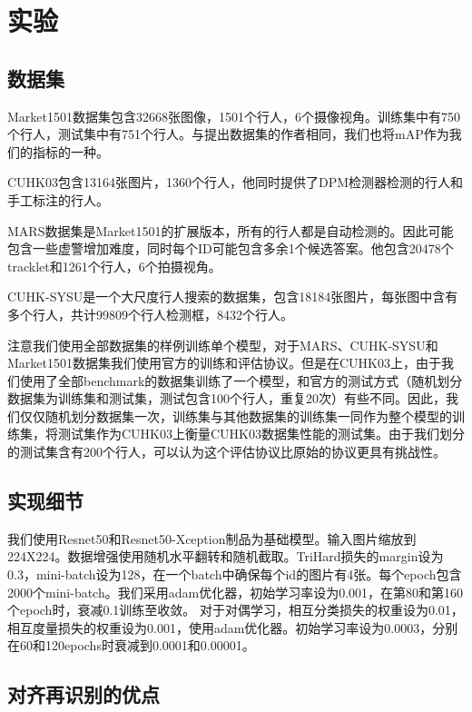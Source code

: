 \section{实验}

\subsection{数据集}

Market1501数据集包含32668张图像，1501个行人，6个摄像视角。训练集中有750个行人，测试集中有751个行人。与提出数据集的作者相同，我们也将mAP作为我们的指标的一种。

CUHK03包含13164张图片，1360个行人，他同时提供了DPM检测器检测的行人和手工标注的行人。

MARS数据集是Market1501的扩展版本，所有的行人都是自动检测的。因此可能包含一些虚警增加难度，同时每个ID可能包含多余1个候选答案。他包含20478个tracklet和1261个行人，6个拍摄视角。

CUHK-SYSU是一个大尺度行人搜索的数据集，包含18184张图片，每张图中含有多个行人，共计99809个行人检测框，8432个行人。

注意我们使用全部数据集的样例训练单个模型，对于MARS、CUHK-SYSU和Market1501数据集我们使用官方的训练和评估协议。但是在CUHK03上，由于我们使用了全部benchmark的数据集训练了一个模型，和官方的测试方式（随机划分数据集为训练集和测试集，测试包含100个行人，重复20次）有些不同。因此，我们仅仅随机划分数据集一次，训练集与其他数据集的训练集一同作为整个模型的训练集，将测试集作为CUHK03上衡量CUHK03数据集性能的测试集。由于我们划分的测试集含有200个行人，可以认为这个评估协议比原始的协议更具有挑战性。

\subsection{实现细节}

我们使用Resnet50和Resnet50-Xception制品为基础模型。输入图片缩放到224X224。数据增强使用随机水平翻转和随机截取。TriHard损失的margin设为0.3，mini-batch设为128，在一个batch中确保每个id的图片有4张。每个epoch包含2000个mini-batch。我们采用adam优化器，初始学习率设为0.001，在第80和第160个epoch时，衰减0.1训练至收敛。
对于对偶学习，相互分类损失的权重设为0.01，相互度量损失的权重设为0.001，使用adam优化器。初始学习率设为0.0003，分别在60和120epochs时衰减到0.0001和0.00001。

\subsection{对齐再识别的优点}

